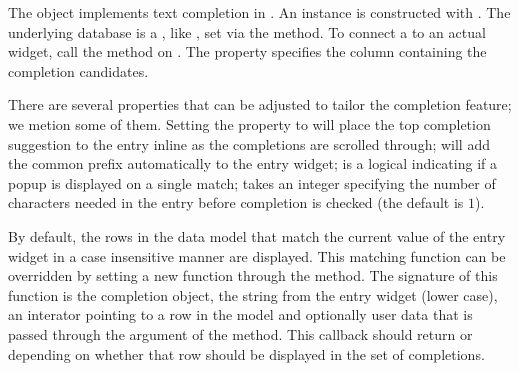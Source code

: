The  object implements text completion in
\GTK. An instance is constructed with
. The underlying database is a
, like , set via the
 method. To connect a
 to an actual  widget, call
the  method on .  The
 property specifies the column containing the
completion candidates. 

There are several properties that can be adjusted to tailor the
completion feature; we metion some of them. Setting the property
 to  will place the top completion
suggestion to the entry inline as the completions are scrolled
through;  will add the common prefix
automatically to the entry widget;  is a
logical indicating if a popup is displayed on a single match;
 takes an integer specifying the number of
characters needed in the entry before completion is checked (the
default is $1$).

By default, the rows in the data model that match the current value of
the entry widget in a case insensitive manner are displayed. This
matching function can be overridden by setting a new \R\/ function through
the  method. The signature of
this function is the completion object, the string from the entry
widget (lower case), an interator pointing to a row in the model and
optionally user data that is passed through the 
argument of the  method. This callback should
return  or  depending on whether that row
should be displayed in the set of completions.

